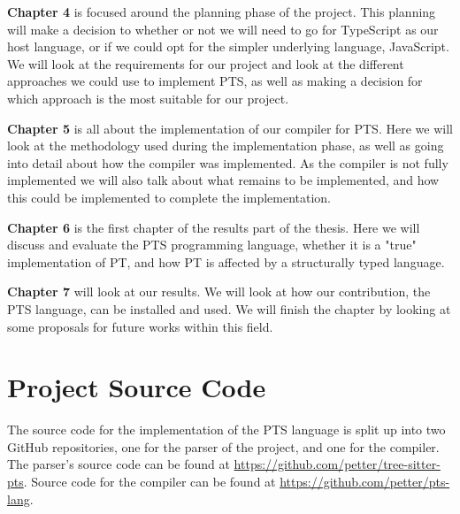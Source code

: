 \textbf{Chapter 4} is focused around the planning phase of the project.
This planning will make a decision to whether or not we will need to go for TypeScript as our host language, or if we could opt for the simpler underlying language, JavaScript.
We will look at the requirements for our project and look at the different approaches we could use to implement PTS, as well as making a decision for which approach is the most suitable for our project.

\textbf{Chapter 5} is all about the implementation of our compiler for PTS\@.
Here we will look at the methodology used during the implementation phase, as well as going into detail about how the compiler was implemented.
As the compiler is not fully implemented we will also talk about what remains to be implemented, and how this could be implemented to complete the implementation.

\textbf{Chapter 6} is the first chapter of the results part of the thesis.
Here we will discuss and evaluate the PTS programming language, whether it is a "true" implementation of PT, and how PT is affected by a structurally typed language.

\textbf{Chapter 7} will look at our results.
We will look at how our contribution, the PTS language, can be installed and used.
We will finish the chapter by looking at some proposals for future works within this field.

\section{Project Source Code}\label{sec:project-source-code}

The source code for the implementation of the PTS language is split up into two GitHub repositories, one for the parser of the project, and one for the compiler.
The parser's source code can be found at \url{https://github.com/petter/tree-sitter-pts}.
Source code for the compiler can be found at \url{https://github.com/petter/pts-lang}.


